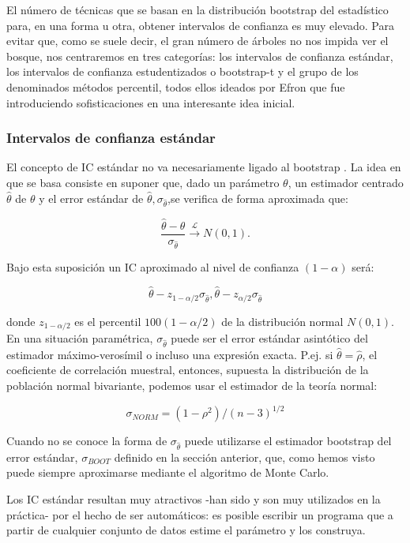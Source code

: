 \documentclass[
]{article}
\begin{document}
El número de técnicas que se basan en la distribución bootstrap del estadístico para, en una forma u otra, obtener intervalos de confianza es muy elevado. Para evitar que, como se suele decir, el gran número de árboles no nos impida ver el bosque, nos centraremos en tres categorías: los intervalos de confianza estándar, los intervalos de confianza estudentizados o bootstrap-t y el grupo de los denominados métodos percentil, todos ellos ideados por Efron que fue introduciendo sofisticaciones en una interesante idea inicial.

\subsubsection{Intervalos de confianza estándar}\label{intervalos-de-confianza-estuxe1ndar}

El concepto de IC estándar no va necesariamente ligado al bootstrap . La idea en que se basa consiste en suponer que, dado un parámetro \(\theta\), un estimador centrado \(\hat{\theta}\) de \(\theta\) y el error estándar de \(\hat{\theta}, \sigma_{\hat{\theta}}\),se verifica de forma aproximada que:

\[
\frac{\hat{\theta}-\theta}{\sigma_{\hat{\theta}}} \xrightarrow{\mathcal{L}} N(0,1) .
\]

Bajo esta suposición un IC aproximado al nivel de confianza \((1-\alpha)\) será:

\[
\hat{\theta}-z_{1-\alpha / 2} \sigma_{\hat{\theta}}, \hat{\theta}-z_{\alpha / 2} \sigma_{\hat{\theta}}
\]

donde \(z_{1-\alpha / 2}\) es el percentil \(100(1-\alpha / 2)\) de la distribución normal \(N(0,1)\).
En una situación paramétrica, \(\sigma_{\hat{\theta}}\) puede ser el error estándar asintótico del estimador máximo-verosímil o incluso una expresión exacta. P.ej. si \(\hat{\theta}=\hat{\rho}\), el coeficiente de correlación muestral, entonces, supuesta la distribución de la población normal bivariante, podemos usar el estimador de la teoría normal:

\[
\sigma_{N O R M}=\left(1-\rho^{2}\right) /(n-3)^{1 / 2}
\]

Cuando no se conoce la forma de \(\sigma_{\hat{\theta}}\) puede utilizarse el estimador bootstrap del error estándar, \(\sigma_{B O O T}\) definido en la sección anterior, que, como hemos visto puede siempre aproximarse mediante el algoritmo de Monte Carlo.

Los IC estándar resultan muy atractivos -han sido y son muy utilizados en la práctica- por el hecho de ser automáticos: es posible escribir un programa que a partir de cualquier conjunto de datos estime el parámetro y los construya.
\end{document}
